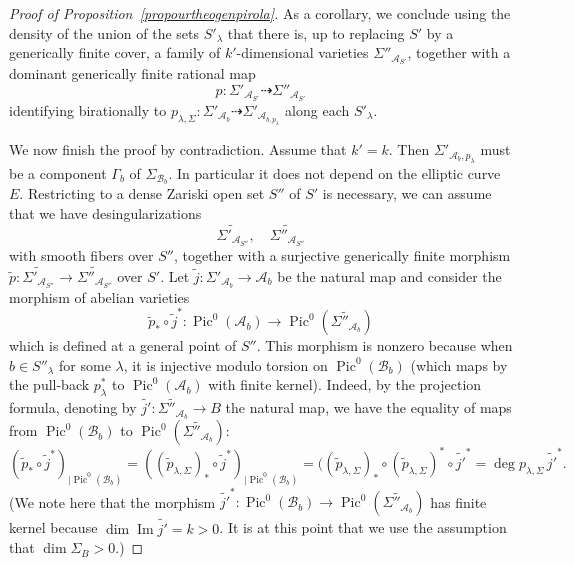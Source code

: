 \documentclass[11pt]{article}
\theoremstyle{definition}
\numberwithin{equation}{section}
\numberwithin{figure}{section}
\numberwithin{table}{section}
\DeclareMathOperator{\Pic}{Pic}
\DeclareMathOperator{\im}{Im}
\begin{document}
\begin{proof}[Proof of Proposition~\ref{propourtheogenpirola}]
As a corollary, we conclude using the density of the union of the sets $S'_\lambda$ that there is, up to replacing $S'$ by a generically finite cover, a family of $k'$-dimensional varieties $\Sigma''_{\mathcal{A}_{S'}}$, together with a dominant generically finite rational map
\begin{equation}\label{eqpfam}
p: \Sigma'_{\mathcal{A}_{S'}}\dashrightarrow \Sigma''_{\mathcal{A}_{S'}}
\end{equation}
identifying birationally to $p_{\lambda,\Sigma}:\Sigma'_{\mathcal{A}_{b}}\dashrightarrow
\Sigma'_{\mathcal{A}_{b,p_\lambda}}$ along each $S'_\lambda$.

We now finish the proof by contradiction. Assume that $k'=k$. Then $\Sigma'_{\mathcal{A}_b,p_\lambda}$ must be a component $\Gamma_b$ of $\Sigma_{\mathcal{B}_b}$. In particular it does not depend on the elliptic curve $E$. Restricting to a dense Zariski open set $S''$ of $S'$ is necessary, we can assume that we have desingularizations
\begin{equation}\label{eqpfam1}
\widetilde{\Sigma'_{\mathcal{A}_{S''}}},\quad \widetilde{\Sigma''_{\mathcal{A}_{S''}}}
\end{equation}
with smooth fibers over $S''$, together with a surjective generically finite morphism $\tilde{p}:\widetilde{\Sigma'_{\mathcal{A}_{S''}}}\rightarrow \widetilde{\Sigma''_{\mathcal{A}_{S''}}}$ over $S'$. Let $\tilde{j}:\Sigma'_{\mathcal{A}_b}\rightarrow \mathcal{A}_b$ be the natural map and consider the morphism of abelian varieties
\[
\tilde{p}_*\circ \tilde{j}^*:\Pic^0(\mathcal{A}_b)\rightarrow \Pic^0(\widetilde{\Sigma''_{\mathcal{A}_{b}}})
\]
which is defined at a general point of $S''$. This morphism is nonzero because when $b\in S''_\lambda$ for some $\lambda$, it is injective modulo torsion on $\Pic^0(\mathcal{B}_b)$ (which maps by the pull-back $p_\lambda^*$ to $ \Pic^0(\mathcal{A}_b)$ with finite kernel). Indeed, by the projection formula, denoting by $\tilde{j'}:\widetilde{\Sigma''_{\mathcal{A}_{b}}}\rightarrow B$ the natural map, we have the equality of maps from $\Pic^0(\mathcal{B}_b)$ to $\Pic^0(\widetilde{\Sigma''_{\mathcal{A}_{b}}})$:
\[
(\tilde{p}_*\circ \tilde{j}^*)_{\mid \Pic^0(\mathcal{B}_b)}=
((\tilde{p}_{\lambda,\Sigma})_*\circ \tilde{j}^*)_{\mid \Pic^0(\mathcal{B}_b)}=
((\tilde{p}_{\lambda,\Sigma})_*\circ(\tilde{p}_{\lambda,\Sigma})^*\circ \tilde{j'}^*=\deg p_{\lambda,\Sigma} \,\tilde{j'}^*.
\]
(We note here that the morphism $\tilde{j'}^*:\Pic^0(\mathcal{B}_b)\rightarrow\Pic^0(\widetilde{\Sigma''_{\mathcal{A}_{b}}})$ has finite kernel because $\dim \im \tilde{j'}=k>0$. It is at this point that we use the assumption that $\dim \Sigma_B>0$.)


\end{proof}
\end{document}
